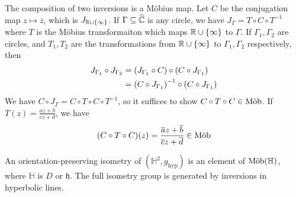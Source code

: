 \begin{remark}
	The composition of two inversions is a M\"obius map.
	Let \( C \) be the conjugation map \( z \mapsto \overline z \), which is \( J_{\mathbb R \cup \qty{\infty}} \).
	If \( \Gamma \subseteq \widehat{\mathbb C} \) is any circle, we have \( J_\Gamma = T \circ C \circ T^{-1} \) where \( T \) is the M\"obius transformaiton which maps \( \mathbb R \cup \qty{\infty} \) to \( \Gamma \).
	If \( \Gamma_1, \Gamma_2 \) are circles, and \( T_1, T_2 \) are the transformations from \( \mathbb R \cup \qty{\infty} \) to \( \Gamma_1, \Gamma_2 \) respectively, then
	\begin{align*}
		J_{\Gamma_1} \circ J_{\Gamma_2} & = \qty(J_{\Gamma_1} \circ C) \circ \qty(C \circ J_{\Gamma_1})      \\
		                                & = \qty(C \circ J_{\Gamma_1})^{-1} \circ \qty(C \circ J_{\Gamma_1})
	\end{align*}
	We have \( C \circ J_\Gamma = C \circ T \circ C \circ T^{-1} \), so it suffices to show \( C \circ T \circ C \in \text{M\"ob} \).
	If \( T(z) = \frac{az+b}{cz+d} \), we have
	\[
		(C \circ T \circ C)(z) = \frac{\overline a z + \overline b}{\overline c z + \overline d} \in \text{M\"ob}
	\]
\end{remark}
\begin{lemma}
	An orientation-preserving isometry of \( (\mathbb H^2, g_{\text{hyp}}) \) is an element of \( \text{M\"ob}(\mathbb H) \), where \( \mathbb H \) is \( D \) or \( \mathfrak{h} \).
	The full isometry group is generated by inversions in hyperbolic lines.
\end{lemma}

